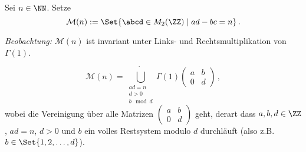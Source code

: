\begin{defi}
Sei $n \in \NN$. Setze 
\[
\mathcal M(n) := \Set{ \abcd \in M_2(\ZZ) \mid ad - bc = n }
\,.
\]
\end{defi}

\emph{Beobachtung:} $\mathcal M(n)$ ist invariant unter Links- und Rechtsmultiplikation von $\Gamma (1)$. 

\begin{lemm}
\[
\mathcal M (n) = \dot{\bigcup_{\substack{ad = n\\ d > 0\\
b \mod d}}} \Gamma(1) \begin{pmatrix}a&b\\0&d\end{pmatrix}
\,,
\]
wobei die Vereinigung über alle Matrizen $\begin{pmatrix}a&b\\0&d\end{pmatrix}$ geht, derart dass $a,b,d \in \ZZ$, $ad = n$, $d > 0$ und $b$ ein volles Restsystem modulo $d$ durchläuft (also z.B. $b \in \Set{1, 2, \ldots, d}$).
\end{lemm}

